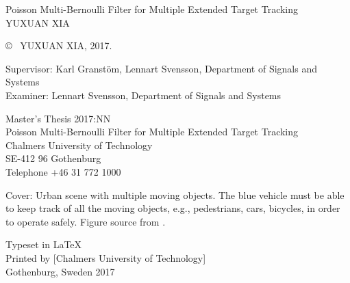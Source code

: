 \newpage
\thispagestyle{plain}
\vspace*{4.5cm}
Poisson Multi-Bernoulli Filter for Multiple Extended Target Tracking\\
YUXUAN XIA \setlength{\parskip}{1cm}

\copyright ~ YUXUAN XIA, 2017. \setlength{\parskip}{1cm}

Supervisor: Karl Granst{\"o}m, Lennart Svensson, Department of Signals and Systems\\
Examiner: Lennart Svensson, Department of Signals and Systems \setlength{\parskip}{1cm}

Master's Thesis 2017:NN\\	%
Poisson Multi-Bernoulli Filter for Multiple Extended Target Tracking\\
Chalmers University of Technology\\
SE-412 96 Gothenburg\\
Telephone +46 31 772 1000 \setlength{\parskip}{0.5cm}

\vfill
Cover: Urban scene with multiple moving objects. The blue vehicle must be able to keep track of all the moving objects, e.g., pedestrians, cars, bicycles, in order to operate safely. Figure source from \cite{rfsextended}. \setlength{\parskip}{0.5cm}

Typeset in \LaTeX \\
Printed by [Chalmers University of Technology]\\
Gothenburg, Sweden 2017

